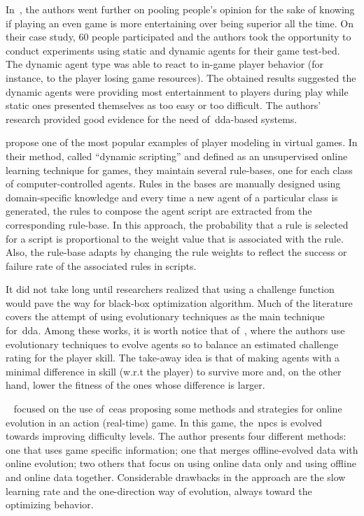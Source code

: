 In~\cite{hagelback_measuring_2009}, the authors went further on pooling people's opinion for the sake of knowing if playing an even game is more entertaining over being superior all the time. On their case study, 60 people participated and the authors took the opportunity to conduct experiments using static and dynamic agents for their game test-bed. The dynamic agent type was able to react to in-game player behavior (for instance, to the player losing game resources). The obtained results suggested the dynamic agents were providing most entertainment to players during play while static ones presented themselves as too easy or too difficult. The authors' research provided good evidence for the need of~\gls{dda}-based systems.

\cite{spronck_-line_2004} propose one of the most popular examples of player modeling in virtual games. In their method, called ``dynamic scripting'' and defined as an unsupervised online learning technique for games, they maintain several rule-bases, one for each class of computer-controlled agents. Rules in the bases are manually designed using domain-specific knowledge and every time a new agent of a particular class is generated, the rules to compose the agent script are extracted from the corresponding rule-base. In this approach, the probability that a rule is selected for a script is proportional to the weight value that is associated with the rule. Also, the rule-base adapts by changing the rule weights to reflect the success or failure rate of the associated rules in scripts.

It did not take long until researchers realized that using a challenge function would pave the way for black-box optimization algorithm. Much of the literature covers the attempt of using evolutionary techniques as the main technique for~\gls{dda}. Among these works, it is worth notice that of~\cite{olesen_real-time_2008}, where the authors use evolutionary techniques to evolve agents so to balance an estimated challenge rating for the player skill. The take-away idea is that of making agents with a minimal difference in skill (w.r.t the player) to survive more and, on the other hand, lower the fitness of the ones whose difference is larger.

~\cite{demasi_-line_2003} focused on the use of~\glspl{cea} proposing some methods and strategies for online evolution in an action (real-time) game. In this game, the~\glspl{npc} is evolved towards improving difficulty levels. The author presents four different methods: one that uses game specific information; one that merges offline-evolved data with online evolution; two others that focus on using online data only and using offline and online data together. Considerable drawbacks in the approach are the slow learning rate and the one-direction way of evolution, always toward the optimizing behavior.

